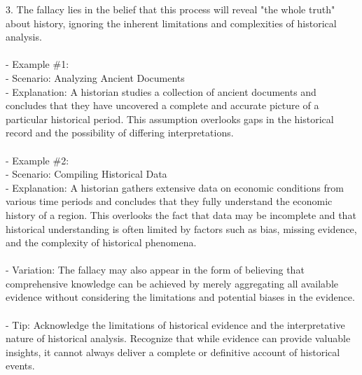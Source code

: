 \documentclass[a4paper,12pt,single,pdftex]{scrbook}
\begin{document}
    
        3. The fallacy lies in the belief that this process will reveal "the whole truth" about history, ignoring the inherent limitations and complexities of historical analysis.
    \\

    
      
    \\

    
      - Example \#1:
    \\

    
        - Scenario: Analyzing Ancient Documents
    \\

    
        - Explanation: A historian studies a collection of ancient documents and concludes that they have uncovered a complete and accurate picture of a particular historical period. This assumption overlooks gaps in the historical record and the possibility of differing interpretations.
    \\

    
      
    \\

    
      - Example \#2:
    \\

    
        - Scenario: Compiling Historical Data
    \\

    
        - Explanation: A historian gathers extensive data on economic conditions from various time periods and concludes that they fully understand the economic history of a region. This overlooks the fact that data may be incomplete and that historical understanding is often limited by factors such as bias, missing evidence, and the complexity of historical phenomena.
    \\

    
      
    \\

    
      - Variation: The fallacy may also appear in the form of believing that comprehensive knowledge can be achieved by merely aggregating all available evidence without considering the limitations and potential biases in the evidence.
    \\

    
      
    \\

    
      - Tip: Acknowledge the limitations of historical evidence and the interpretative nature of historical analysis. Recognize that while evidence can provide valuable insights, it cannot always deliver a complete or definitive account of historical events.
    \\
\end{document}
